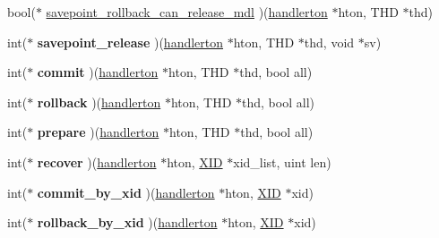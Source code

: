 \begin{DoxyCompactItemize}
\item 
bool($\ast$ \mbox{\hyperlink{structhandlerton_ac79bf3ab67509d85a67f800c26b814b1}{savepoint\+\_\+rollback\+\_\+can\+\_\+release\+\_\+mdl}} )(\mbox{\hyperlink{structhandlerton}{handlerton}} $\ast$hton, T\+HD $\ast$thd)
\item 
\mbox{\label{structhandlerton_acdeb7c0c8f51ec3e39174228827e459a}} 
int($\ast$ {\bfseries savepoint\+\_\+release} )(\mbox{\hyperlink{structhandlerton}{handlerton}} $\ast$hton, T\+HD $\ast$thd, void $\ast$sv)
\item 
\mbox{\label{structhandlerton_a4f4097944c1ada6c128a67fc380b70fc}} 
int($\ast$ {\bfseries commit} )(\mbox{\hyperlink{structhandlerton}{handlerton}} $\ast$hton, T\+HD $\ast$thd, bool all)
\item 
\mbox{\label{structhandlerton_a095d2cbd5510fdeeb3dea0216adadb0f}} 
int($\ast$ {\bfseries rollback} )(\mbox{\hyperlink{structhandlerton}{handlerton}} $\ast$hton, T\+HD $\ast$thd, bool all)
\item 
\mbox{\label{structhandlerton_a713bce9fa6b3f60ab7480c318e1b10be}} 
int($\ast$ {\bfseries prepare} )(\mbox{\hyperlink{structhandlerton}{handlerton}} $\ast$hton, T\+HD $\ast$thd, bool all)
\item 
\mbox{\label{structhandlerton_a265a16a5fc3084f06606c34ceae822cc}} 
int($\ast$ {\bfseries recover} )(\mbox{\hyperlink{structhandlerton}{handlerton}} $\ast$hton, \mbox{\hyperlink{structxid__t}{X\+ID}} $\ast$xid\+\_\+list, uint len)
\item 
\mbox{\label{structhandlerton_a7b8fe766012c674ebf6d4815b18ac1c7}} 
int($\ast$ {\bfseries commit\+\_\+by\+\_\+xid} )(\mbox{\hyperlink{structhandlerton}{handlerton}} $\ast$hton, \mbox{\hyperlink{structxid__t}{X\+ID}} $\ast$xid)
\item 
\mbox{\label{structhandlerton_aea257f4033e04543dd9f9f3af6942b59}} 
int($\ast$ {\bfseries rollback\+\_\+by\+\_\+xid} )(\mbox{\hyperlink{structhandlerton}{handlerton}} $\ast$hton, \mbox{\hyperlink{structxid__t}{X\+ID}} $\ast$xid)
\item 
\mbox{\label{structhandlerton_a6b4cd3586ca45f8151614433824e0213}} 

\end{DoxyCompactItemize}

